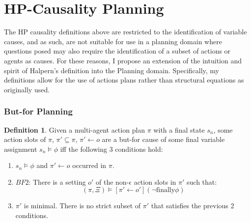 \documentclass{article}
\theoremstyle{plain}
\theoremstyle{definition}
\newtheorem{defn}[thm]{Definition} %
\begin{document}
\newpage

\section{HP-Causality Planning} \label{sec:hpCausalityPlanning}
The HP causality definitions above are restricted to the identification of variable causes, and as such, are not suitable for use in a planning domain where questions posed may also require the identification of a subset of actions or agents as causes. For these reasons, I propose an extension of the intuition and spirit of Halpern's definition into the Planning domain. Specifically, my definitions allow for the use of actions plans rather than structural equations as originally used.

\subsubsection*{But-for Planning} \label{sec:butForPlanning}
\begin{defn} 

Given a multi-agent action plan $\pi$ with a final state $s_n$, some action slots of $\pi$, $\pi' \subseteq \pi$, $\pi' \leftarrow o$ are a but-for cause of some final variable assignment $s_n \models \phi$ iff the following 3 conditions hold:
\begin{enumerate}
\item $s_n \models \phi$ and $\pi'\leftarrow o$ occurred in $\pi$.
\item $BF2$: There is a setting $o'$ of the non-$\epsilon$ action slots in $\pi'$ such that:
\[
(\pi, \Xi) \models [\pi' \leftarrow o'](\lnot \textrm{finally} \phi)
\]
\item $\pi'$ is minimal. There is no strict subset of $\pi'$ that satisfies the previous 2 conditions.
\end{enumerate}


\end{defn}
\end{document}
